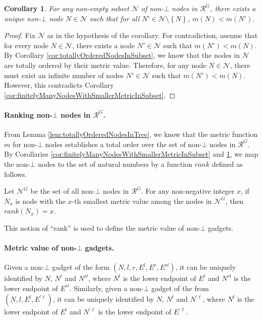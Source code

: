 \documentclass[11pt]{article}
\numberwithin{theorem}{section}
\newtheorem{corollary}[theorem]{Corollary}
\newcommand{\set}[1]{\left\{#1\right\}}
\begin{document}
\begin{corollary}\label{cor:NodesWithSmallestMetricInSubset}
For any non-empty subset $\mathcal{N}$ of non-$\bot$ nodes in $\mathcal{R}^G$, there exists a unique non-$\bot$ node $N \in \mathcal{N}$ such that for all $N' \in \mathcal{N}\setminus \set{N}$, $m(N) < m(N')$.
\end{corollary}
\begin{proof}
Fix $\mathcal{N}$ as in the hypothesis of the corollary. For contradiction, assume that for every node $N \in \mathcal{N}$, there exists a node $N' \in \mathcal{N}$ such that $m(N') < m(N)$. By Corollary \ref{cor:totallyOrderedNodesInSubset}, we know that the nodes in $\mathcal{N}$ are totally ordered by their metric value. Therefore, for any node $N \in \mathcal{N}$, there must exist an infinite number of nodes $N'\in \mathcal{N}$ such that $m(N') < m(N)$. However, this contradicts  Corollary \ref{cor:finitelyManyNodesWithSmallerMetricInSubset}.
\end{proof}

\paragraph{Ranking non-$\bot$ nodes in $\mathcal{R}^G$.}
From Lemma \ref{lem:totallyOrderedNodesInTree}, we know that the metric function $m$ for non-$\bot$ nodes establishes a total order over the set of non-$\bot$ nodes in $\mathcal{R}^G$. By Corollaries \ref{cor:finitelyManyNodesWithSmallerMetricInSubset} and  \ref{cor:NodesWithSmallestMetricInSubset}, we map the non-$\bot$ nodes to the set of natural numbers by a function $rank$ defined as follows.

Let $\mathcal{N}^G$ be the set of all non-$\bot$ nodes in $\mathcal{R}^G$.
For any non-negative integer $x$, if $N_x$ is node with the $x$-th smallest metric value among the nodes in $\mathcal{N}^G$, then $rank(N_x) = x$. 

This notion of ``rank'' is used to define the metric value of non-$\bot$ gadgets.

\paragraph{Metric value of non-$\bot$ gadgets.} 
Given a non-$\bot$ gadget of the form $(N,l,r,E^l,E^r,E^{rl})$, it can be uniquely identified by $N$, $N^l$ and $N^{rl}$, where $N^l$ is the lower endpoint of $E^{l}$ and $N^{rl}$ is the lower endpoint of $E^{rl}$. Similarly, given a non-$\bot$ gadget of the from $(N,l,E^l,E^{\prime \ell})$, it can be uniquely identified by $N$, $N^l$ and $N^{\prime \ell}$, where $N^l$ is the lower endpoint of $E^l$ and $N^{\prime \ell}$ is the lower endpoint of $E^{\prime \ell}$.
\end{document}
